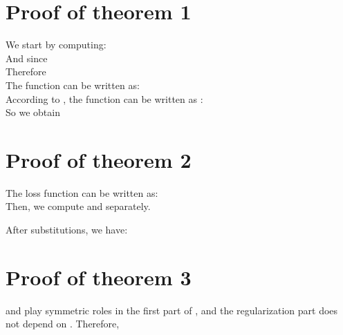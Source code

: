 \documentclass{article}
\begin{document}
\newpage
\appendix

\section{Proof of theorem 1}

We start by computing: \\

And since \\

Therefore \\

The  function can be written as: \\

According to \cite{paper65}, the  function can be written as : \\

So we obtain \\


\section{Proof of theorem 2}

The loss function  can be written as: \\


Then, we compute  and  separately.


After substitutions, we have:



\section{Proof of theorem 3}

 and  play symmetric roles in the first part of , and the regularization part does not depend on . Therefore,
\end{document}
